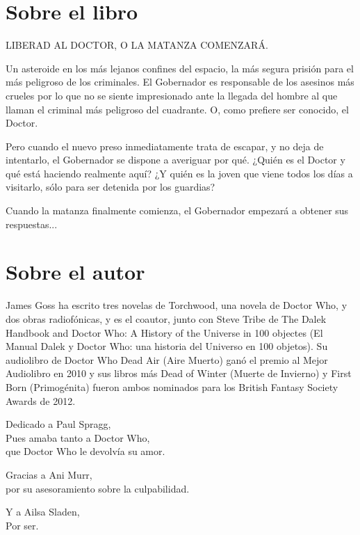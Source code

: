 \newpage

\section*{Sobre el libro}

LIBERAD AL DOCTOR, O LA MATANZA COMENZARÁ.

\mbox{}

Un asteroide en los más lejanos confines del espacio, la más segura prisión para el más peligroso de los criminales. El Gobernador es responsable de los asesinos más crueles por lo que no se siente impresionado ante la llegada del hombre al que llaman el criminal más peligroso del cuadrante. O, como prefiere ser conocido, el Doctor.

Pero cuando el nuevo preso inmediatamente trata de escapar, y no deja de intentarlo, el Gobernador se dispone a averiguar por qué. ¿Quién es el Doctor y qué está haciendo realmente aquí? ¿Y quién es la joven que viene todos los días a visitarlo, sólo para ser detenida por los guardias?

Cuando la matanza finalmente comienza, el Gobernador empezará a obtener sus respuestas...

\section*{Sobre el autor}

James Goss ha escrito tres novelas de Torchwood, una novela de Doctor Who, y dos obras radiofónicas, y es el coautor, junto con Steve Tribe de The Dalek Handbook and Doctor Who: A History of the Universe in 100 objectes (El Manual Dalek y Doctor Who: una historia del Universo en 100 objetos). Su audiolibro de Doctor Who Dead Air (Aire Muerto) ganó el premio al Mejor Audiolibro en 2010 y sus libros más Dead of Winter (Muerte de Invierno) y First Born (Primogénita) fueron ambos nominados para los British Fantasy Society Awards de 2012.


\newpage

\begin{center}
Dedicado a Paul Spragg, \\ 
Pues amaba tanto a Doctor Who, \\ 
que Doctor Who le devolvía su amor. \\

\mbox{}

Gracias a Ani Murr, \\
por su asesoramiento sobre la culpabilidad. \\

\mbox{}

Y a Ailsa Sladen, \\
Por ser.
\end{center}

\vfill